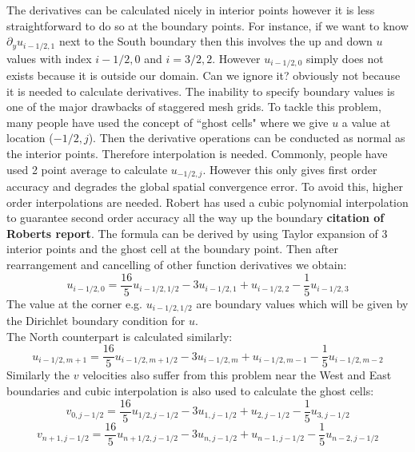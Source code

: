 The derivatives can be calculated nicely in interior points however it is less straightforward to do so at the boundary points. For instance, if we want to know $\partial_y u_{i-1/2,1}$ next to the South boundary then this involves the up and down $u$ values with index $i-1/2,0$ and $i=3/2,2$. However $u_{i-1/2,0}$ simply does not exists because it is outside our domain. Can we ignore it? obviously not because it is needed to calculate derivatives. The inability to specify boundary values is one of the major drawbacks of staggered mesh grids. To tackle this problem, many people have used the concept of ``ghost cells" where we give $u$ a value at location ($-1/2,j$). Then the derivative operations can be conducted as normal as the interior points. Therefore interpolation is needed. Commonly, people have used 2 point average to calculate $u_{-1/2,j}$. However this only gives first order accuracy and degrades the global spatial convergence error. To avoid this, higher order interpolations are needed. Robert has used a cubic polynomial interpolation to guarantee second order accuracy all the way up the boundary \textbf{citation of Roberts report}. The formula can be derived by using Taylor expansion of 3 interior points and the ghost cell at the boundary point. Then after rearrangement and cancelling of other function derivatives we obtain:
\begin{equation}
u_{i-1/2,0} = \dfrac{16}{5} u_{i-1/2,1/2} - 3 u_{i-1/2,1} + u_{i-1/2,2} - \dfrac{1}{5}u_{i-1/2,3}
\end{equation}
The value at the corner e.g. $u_{i-1/2,1/2}$ are boundary values which will be given by the Dirichlet boundary condition for $u$.\\

The North counterpart is calculated similarly:
\begin{equation}
u_{i-1/2,m+1} = \dfrac{16}{5} u_{i-1/2,m+1/2} - 3 u_{i-1/2,m} + u_{i-1/2,m-1} - \dfrac{1}{5}u_{i-1/2,m-2}
\end{equation}
Similarly the $v$ velocities also suffer from this problem near the West and East boundaries and cubic interpolation is also used to calculate the ghost cells:
\begin{equation}
v_{0,j-1/2} = \dfrac{16}{5} u_{1/2,j-1/2} - 3 u_{1,j-1/2} + u_{2,j-1/2} - \dfrac{1}{5}u_{3,j-1/2}
\end{equation}
\begin{equation}
v_{n+1,j-1/2} = \dfrac{16}{5} u_{n+1/2,j-1/2} - 3 u_{n,j-1/2} + u_{n-1,j-1/2} - \dfrac{1}{5}u_{n-2,j-1/2}
\end{equation}

